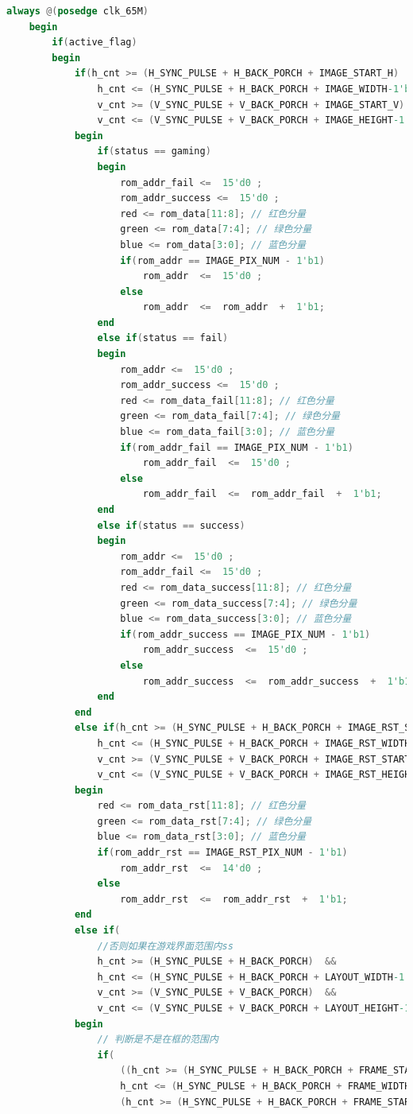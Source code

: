 \documentclass[UTF8]{article}
\begin{document}
\begin{lstlisting}[language=Verilog]
	always @(posedge clk_65M)
	begin
		if(active_flag) 
		begin
			if(h_cnt >= (H_SYNC_PULSE + H_BACK_PORCH + IMAGE_START_H)  &&
				h_cnt <= (H_SYNC_PULSE + H_BACK_PORCH + IMAGE_WIDTH-1'b1 + IMAGE_START_H)  && 
				v_cnt >= (V_SYNC_PULSE + V_BACK_PORCH + IMAGE_START_V)  &&
				v_cnt <= (V_SYNC_PULSE + V_BACK_PORCH + IMAGE_HEIGHT-1'b1 + IMAGE_START_V))
			begin
				if(status == gaming)
				begin
					rom_addr_fail <=  15'd0 ;
					rom_addr_success <=  15'd0 ;
					red <= rom_data[11:8]; // 红色分量
					green <= rom_data[7:4]; // 绿色分量
					blue <= rom_data[3:0]; // 蓝色分量
					if(rom_addr == IMAGE_PIX_NUM - 1'b1)
						rom_addr  <=  15'd0 ;
					else
						rom_addr  <=  rom_addr  +  1'b1;  
				end
				else if(status == fail)
				begin
					rom_addr <=  15'd0 ;
					rom_addr_success <=  15'd0 ;
					red <= rom_data_fail[11:8]; // 红色分量
					green <= rom_data_fail[7:4]; // 绿色分量
					blue <= rom_data_fail[3:0]; // 蓝色分量
					if(rom_addr_fail == IMAGE_PIX_NUM - 1'b1)
						rom_addr_fail  <=  15'd0 ;
					else
						rom_addr_fail  <=  rom_addr_fail  +  1'b1;  
				end
				else if(status == success)
				begin
					rom_addr <=  15'd0 ;
					rom_addr_fail <=  15'd0 ;
					red <= rom_data_success[11:8]; // 红色分量
					green <= rom_data_success[7:4]; // 绿色分量
					blue <= rom_data_success[3:0]; // 蓝色分量
					if(rom_addr_success == IMAGE_PIX_NUM - 1'b1)
						rom_addr_success  <=  15'd0 ;
					else
						rom_addr_success  <=  rom_addr_success  +  1'b1;  
				end
			end
			else if(h_cnt >= (H_SYNC_PULSE + H_BACK_PORCH + IMAGE_RST_START_H)  &&
				h_cnt <= (H_SYNC_PULSE + H_BACK_PORCH + IMAGE_RST_WIDTH-1'b1 + IMAGE_RST_START_H)  && 
				v_cnt >= (V_SYNC_PULSE + V_BACK_PORCH + IMAGE_RST_START_V)  &&
				v_cnt <= (V_SYNC_PULSE + V_BACK_PORCH + IMAGE_RST_HEIGHT-1'b1 + IMAGE_RST_START_V))
			begin
				red <= rom_data_rst[11:8]; // 红色分量
				green <= rom_data_rst[7:4]; // 绿色分量
				blue <= rom_data_rst[3:0]; // 蓝色分量
				if(rom_addr_rst == IMAGE_RST_PIX_NUM - 1'b1)
					rom_addr_rst  <=  14'd0 ;
				else
					rom_addr_rst  <=  rom_addr_rst  +  1'b1;  
			end
			else if(
				//否则如果在游戏界面范围内ss
				h_cnt >= (H_SYNC_PULSE + H_BACK_PORCH)  &&
				h_cnt <= (H_SYNC_PULSE + H_BACK_PORCH + LAYOUT_WIDTH-1'b1)  && 
				v_cnt >= (V_SYNC_PULSE + V_BACK_PORCH)  &&
				v_cnt <= (V_SYNC_PULSE + V_BACK_PORCH + LAYOUT_HEIGHT-1'b1))
			begin
				// 判断是不是在框的范围内
				if(
					((h_cnt >= (H_SYNC_PULSE + H_BACK_PORCH + FRAME_START_H_0) &&
					h_cnt <= (H_SYNC_PULSE + H_BACK_PORCH + FRAME_WIDTH-1'b1 + FRAME_START_H_0)) || 
					(h_cnt >= (H_SYNC_PULSE + H_BACK_PORCH + FRAME_START_H_1) &&

\end{lstlisting}
\end{document}
